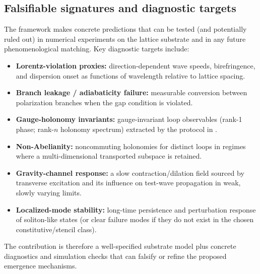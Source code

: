 \subsection{Falsifiable signatures and diagnostic targets}
The framework makes concrete predictions that can be tested (and potentially ruled out) in numerical experiments on
the lattice substrate and in any future phenomenological matching.
Key diagnostic targets include:
\begin{itemize}
\item \textbf{Lorentz-violation proxies:} direction-dependent wave speeds, birefringence, and dispersion onset as functions of wavelength relative to lattice spacing.
\item \textbf{Branch leakage / adiabaticity failure:} measurable conversion between polarization branches when the gap condition  is violated.
\item \textbf{Gauge-holonomy invariants:} gauge-invariant loop observables (rank-1 phase; rank-$n$ holonomy spectrum) extracted by the protocol in .
\item \textbf{Non-Abelianity:} noncommuting holonomies for distinct loops in regimes where a multi-dimensional transported subspace is retained.
\item \textbf{Gravity-channel response:} a slow contraction/dilation field sourced by transverse excitation and its influence on test-wave propagation in weak, slowly varying limits.
\item \textbf{Localized-mode stability:} long-time persistence and perturbation response of soliton-like states (or clear failure modes if they do not exist in the chosen constitutive/stencil class).
\end{itemize}
The contribution is therefore a well-specified substrate model plus concrete diagnostics and simulation checks that can
falsify or refine the proposed emergence mechanisms.
